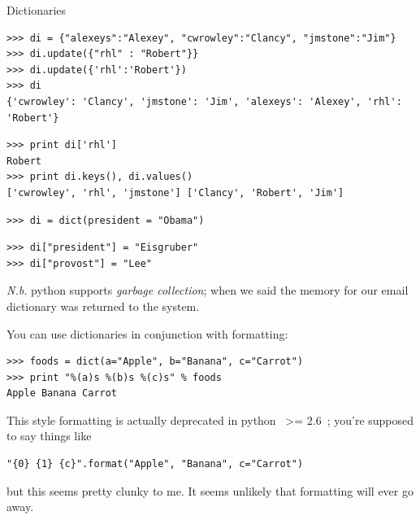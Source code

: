 \documentclass[10pt, t]{beamer}
\let\verb=\codeDelimTwiddles
\begin{document}
\begin{frame}[fragile,label=sec-2-7]{Dictionaries}
 \lstset{language=Python,label= ,caption= ,numbers=none}
\begin{lstlisting}
>>> di = {"alexeys":"Alexey", "cwrowley":"Clancy", "jmstone":"Jim"}
>>> di.update({"rhl" : "Robert"}}
>>> di.update({'rhl':'Robert'})
>>> di
{'cwrowley': 'Clancy', 'jmstone': 'Jim', 'alexeys': 'Alexey', 'rhl': 'Robert'}
\end{lstlisting}
\pause
\lstset{language=Python,label= ,caption= ,numbers=none}
\begin{lstlisting}
>>> print di['rhl']
Robert
>>> print di.keys(), di.values()
['cwrowley', 'rhl', 'jmstone'] ['Clancy', 'Robert', 'Jim']
\end{lstlisting}
\pause
\lstset{language=Python,label= ,caption= ,numbers=none}
\begin{lstlisting}
>>> di = dict(president = "Obama")
\end{lstlisting}
\pause
\lstset{language=Python,label= ,caption= ,numbers=none}
\begin{lstlisting}
>>> di["president"] = "Eisgruber"
>>> di["provost"] = "Lee"
\end{lstlisting}
\pause
\emph{N.b.} python supports \emph{garbage collection}; when we said  the memory for
our email dictionary was returned to the system.

\pause
You can use dictionaries in conjunction with \code{\%} formatting:
\lstset{language=Python,label= ,caption= ,numbers=none}
\begin{lstlisting}
>>> foods = dict(a="Apple", b="Banana", c="Carrot")
>>> print "%(a)s %(b)s %(c)s" % foods
Apple Banana Carrot
\end{lstlisting}

\pause
This style \code{\%} formatting is actually deprecated in python \verb~>= 2.6~; 
you're supposed to say things like
\lstset{language=Python,label= ,caption= ,numbers=none}
\begin{lstlisting}
"{0} {1} {c}".format("Apple", "Banana", c="Carrot")
\end{lstlisting}
but this seems pretty clunky to me.
\pause
It seems unlikely that \code{\%} formatting will ever go away.
\end{frame}
\end{document}
